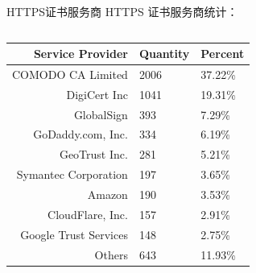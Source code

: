 \documentclass{beamer}
\begin{document}
  \begin{frame}{HTTPS证书服务商}
HTTPS 证书服务商统计：
\begin{columns}
      
  \begin{column}{0.5\textwidth}
    \begin{table}
      \tiny
    \begin{tabular}{r|l|l}
      \toprule
      Service Provider &Quantity & Percent\\
      \midrule
      COMODO CA Limited&2006 & 37.22\%\\
      DigiCert Inc&1041& 19.31\%\\
      GlobalSign &393& 7.29\%\\
      GoDaddy.com, Inc.&334& 6.19\%\\
      GeoTrust Inc.&281& 5.21\%\\
      Symantec Corporation&197& 3.65\%\\
      Amazon&190& 3.53\%\\
      CloudFlare, Inc.&157& 2.91\%\\
      Google Trust Services&148& 2.75\%\\
      Others & 643& 11.93\%\\
      \bottomrule
      \end{tabular}
    \end{table}



\end{column}
\end{columns}
\end{frame}
\end{document}
